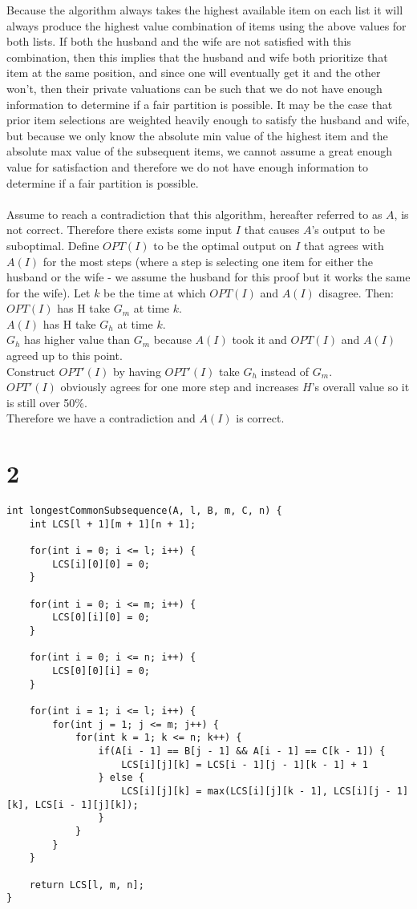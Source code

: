 \documentclass[letterpaper,notitlepage,twoside]{article}
\begin{document}
Because the algorithm always takes the highest available item on each list it will always produce the highest value combination of items using the above values for both lists. If both the husband and the wife are not satisfied with this combination, then this implies that the husband and wife both prioritize that item at the same position, and since one will eventually get it and the other won't, then their private valuations can be such that we do not have enough information to determine if a fair partition is possible. It may be the case that prior item selections are weighted heavily enough to satisfy the husband and wife, but because we only know the absolute min value of the highest item and the absolute max value of the subsequent items, we cannot assume a great enough value for satisfaction and therefore we do not have enough information to determine if a fair partition is possible. \\ \\
Assume to reach a contradiction that this algorithm, hereafter referred to as $A$, is not correct. Therefore there exists some input $I$ that causes $A$'s output to be suboptimal. Define $OPT(I)$ to be the optimal output on $I$ that agrees with $A(I)$ for the most steps (where a step is selecting one item for either the husband or the wife - we assume the husband for this proof but it works the same for the wife). Let $k$ be the time at which $OPT(I)$ and $A(I)$ disagree. Then: \\
$OPT(I)$ has H take $G_m$ at time $k$.\\
$A(I)$ has H take $G_h$ at time $k$. \\
$G_h$ has higher value than $G_m$ because $A(I)$ took it and $OPT(I)$ and $A(I)$ agreed up to this point. \\
Construct $OPT'(I)$ by having $OPT'(I)$ take $G_h$ instead of $G_m$. \\
$OPT'(I)$ obviously agrees for one more step and increases $H$'s overall value so it is still over 50\%. \\
Therefore we have a contradiction and $A(I)$ is correct.


\section*{2}
\begin{verbatim}
int longestCommonSubsequence(A, l, B, m, C, n) {
    int LCS[l + 1][m + 1][n + 1];

    for(int i = 0; i <= l; i++) {
        LCS[i][0][0] = 0;
    }

    for(int i = 0; i <= m; i++) {
        LCS[0][i][0] = 0;
    }

    for(int i = 0; i <= n; i++) {
        LCS[0][0][i] = 0;
    }

    for(int i = 1; i <= l; i++) {
        for(int j = 1; j <= m; j++) {
            for(int k = 1; k <= n; k++) {
                if(A[i - 1] == B[j - 1] && A[i - 1] == C[k - 1]) {
                    LCS[i][j][k] = LCS[i - 1][j - 1][k - 1] + 1
                } else {
                    LCS[i][j][k] = max(LCS[i][j][k - 1], LCS[i][j - 1][k], LCS[i - 1][j][k]);
                }
            }
        }
    }

    return LCS[l, m, n];
}
\end{verbatim}
\end{document}
